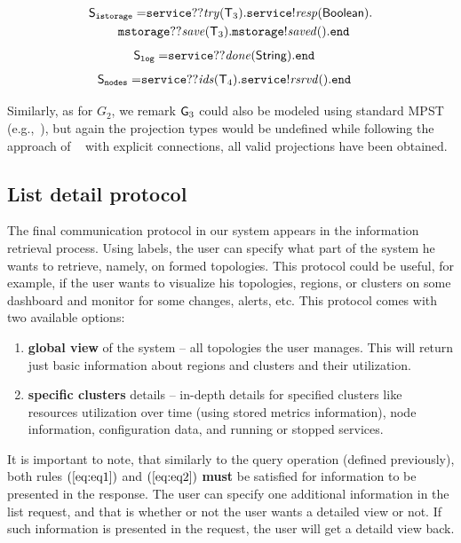 \begin{align*}
	\ST_\mathtt{istorage} =  &
	\mathtt{service}{??}\mathit{try}(\T_3).\mathtt{service}{!}\mathit{resp}(\mathsf{Boolean}).\\ & \hspace{-8mm}
	\mathtt{mstorage}{??}\mathit{save}(\T_3).\mathtt{mstorage}{!}\mathit{saved}().\tend
\end{align*}
\begin{align*}
	{\mathsf S}_\mathtt{log} =  &
	\mathtt{service}{??}\mathit{done}(\mathsf{String}).\mathtt{end}
\end{align*}
\begin{align*}
	{\mathsf S}_\mathtt{nodes} =  &
	\mathtt{service}{??}\mathit{ids}({\mathsf T}_4).\mathtt{service}{!}\mathit{rsrvd}().\mathtt{end}
\end{align*}

\noindent
Similarly, as for $G_2$, we remark ${\sf G}_3$ could also be modeled using standard MPST (e.g.,~\cite{HondaYC08}), but again the projection types would be undefined while following the approach of ~\cite{HuY17} with explicit connections, all valid projections have been obtained.
%
%
\subsection{List detail protocol}\label{sec:list_detail_protocol}
%
The final communication protocol in our system appears in the information retrieval process. Using labels, the user can specify what part of the system he wants to retrieve, namely, on formed topologies. This protocol could be useful, for example, if the user wants to visualize his topologies, regions, or clusters on some dashboard and monitor for some changes, alerts, etc. This protocol comes with two available options: 

\begin{enumerate}[start=1,label={(\bfseries \arabic*)}]
	\item \textbf{global view} of the system -- all topologies the user manages. This will return just basic information about regions and clusters and their utilization.
	\item \textbf{specific clusters} details -- in-depth details for specified clusters like resources utilization over time (using stored metrics information), node information, configuration data, and running or stopped services.
\end{enumerate}

\noindent
It is important to note, that similarly to the query operation (defined previously), both rules $(\ref{eq:eq1})$ and $(\ref{eq:eq2})$ \textbf{must} be satisfied for information to be presented in the response. The user can specify one additional information in the list request, and that is whether or not the user wants a detailed view or not. If such information is presented in the request, the user will get a detaild view back. 

